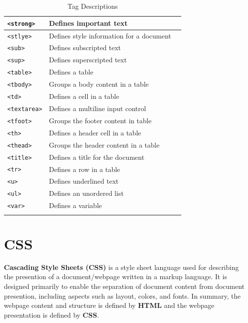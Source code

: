 \documentclass[11pt, letterpaper]{article}
\begin{document}
\begin{longtable}{l p{10cm} l}
			\texttt{<strong>} & Defines important text\\\midrule
			\texttt{<stlye>} & Defines style information for a document\\\midrule
			\texttt{<sub>} & Defines subscripted text\\\midrule
			\texttt{<sup>} & Defines superscripted text\\\midrule
			\texttt{<table>} & Defines a table\\\midrule
			\texttt{<tbody>} & Groups a body content in a table\\\midrule
			\texttt{<td>} & Defines a cell in a table\\\midrule
			\texttt{<textarea>} & Defines a multiline input control\\\midrule
			\texttt{<tfoot>} & Groups the footer content in table\\\midrule
			\texttt{<th>} & Defines a header cell in a table\\\midrule
			\texttt{<thead>} & Groups the header content in a table\\\midrule
			\texttt{<title>} & Defines a title for the document\\\midrule
			\texttt{<tr>} & Defines a row in a table\\\midrule
			\texttt{<u>} & Defines underlined text\\\midrule
			\texttt{<ul>} & Defines an unordered list\\\midrule
			\texttt{<var>} & Defines a variable\\
			\bottomrule

			\caption{Tag Descriptions}
		\end{longtable}
	\section{CSS}
		\textbf{Cascading Style Sheets (CSS)} is a style sheet language used for describing the presention of a document/webpage written in a markup language. It is designed primarily to enable the separation of document content from document presention, including aspects such as layout, colors, and fonts. In summary, the webpage content and structure is defined by \textbf{HTML} and the webpage presentation is defined by \textbf{CSS}.
\end{document}
